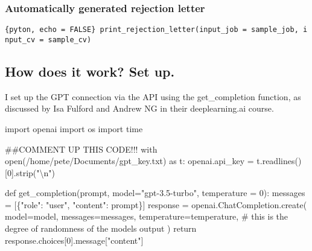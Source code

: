 \documentclass[
  letterpaper,
  DIV=11,
  numbers=noendperiod]{scrartcl}
\newenvironment{Shaded}{\begin{snugshade}}{\end{snugshade}}
\newcommand{\BuiltInTok}[1]{\textcolor[rgb]{0.00,0.23,0.31}{#1}}
\newcommand{\CharTok}[1]{\textcolor[rgb]{0.13,0.47,0.30}{#1}}
\newcommand{\CommentTok}[1]{\textcolor[rgb]{0.37,0.37,0.37}{#1}}
\newcommand{\ControlFlowTok}[1]{\textcolor[rgb]{0.00,0.23,0.31}{#1}}
\newcommand{\DecValTok}[1]{\textcolor[rgb]{0.68,0.00,0.00}{#1}}
\newcommand{\ImportTok}[1]{\textcolor[rgb]{0.00,0.46,0.62}{#1}}
\newcommand{\KeywordTok}[1]{\textcolor[rgb]{0.00,0.23,0.31}{#1}}
\newcommand{\NormalTok}[1]{\textcolor[rgb]{0.00,0.23,0.31}{#1}}
\newcommand{\OperatorTok}[1]{\textcolor[rgb]{0.37,0.37,0.37}{#1}}
\newcommand{\StringTok}[1]{\textcolor[rgb]{0.13,0.47,0.30}{#1}}
\begin{document}
\hypertarget{automatically-generated-rejection-letter}{%
\subsubsection{Automatically generated rejection
letter}\label{automatically-generated-rejection-letter}}

\texttt{\{pyton,\ echo\ =\ FALSE\}\ print\_rejection\_letter(input\_job\ =\ sample\_job,\ input\_cv\ =\ sample\_cv)}

\hypertarget{how-does-it-work-set-up.}{%
\subsection{How does it work? Set up.}\label{how-does-it-work-set-up.}}

I set up the GPT connection via the API using the get\_completion
function, as discussed by Isa Fulford and Andrew NG in their
deeplearning.ai course.

\begin{Shaded}
\begin{Highlighting}[]
\ImportTok{import}\NormalTok{ openai}
\ImportTok{import}\NormalTok{ os}
\ImportTok{import}\NormalTok{ time}

\CommentTok{\#\#COMMENT UP THIS CODE!!!}
\ControlFlowTok{with} \BuiltInTok{open}\NormalTok{(}\StringTok{\textquotesingle{}/home/pete/Documents/gpt\_key.txt\textquotesingle{}}\NormalTok{) }\ImportTok{as}\NormalTok{ t:}
\NormalTok{  openai.api\_key }\OperatorTok{=}\NormalTok{ t.readlines()[}\DecValTok{0}\NormalTok{].strip(}\StringTok{"}\CharTok{\textbackslash{}n}\StringTok{"}\NormalTok{)}


\KeywordTok{def}\NormalTok{ get\_completion(prompt, model}\OperatorTok{=}\StringTok{"gpt{-}3.5{-}turbo"}\NormalTok{, temperature }\OperatorTok{=} \DecValTok{0}\NormalTok{):}
\NormalTok{    messages }\OperatorTok{=}\NormalTok{ [\{}\StringTok{"role"}\NormalTok{: }\StringTok{"user"}\NormalTok{, }\StringTok{"content"}\NormalTok{: prompt\}]}
\NormalTok{    response }\OperatorTok{=}\NormalTok{ openai.ChatCompletion.create(}
\NormalTok{        model}\OperatorTok{=}\NormalTok{model,}
\NormalTok{        messages}\OperatorTok{=}\NormalTok{messages,}
\NormalTok{        temperature}\OperatorTok{=}\NormalTok{temperature, }\CommentTok{\# this is the degree of randomness of the model\textquotesingle{}s output}
\NormalTok{    )}
    \ControlFlowTok{return}\NormalTok{ response.choices[}\DecValTok{0}\NormalTok{].message[}\StringTok{"content"}\NormalTok{]}
\end{Highlighting}
\end{Shaded}
\end{document}
